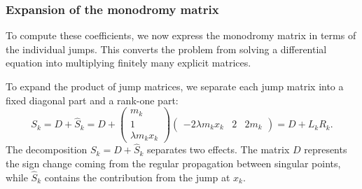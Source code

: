\documentclass[english,master]{liumaiex}
\theoremstyle{thesisplain}
\theoremstyle{thesisdefinition}
\numberwithin{equation}{section}
\begin{document}
\subsubsection*{Expansion of the monodromy matrix}

To compute these coefficients, we now express the monodromy matrix in terms of the individual jumps. This converts the problem from solving a differential equation into multiplying finitely many explicit matrices.

To expand the product of jump matrices, we separate each jump matrix into a fixed diagonal part and a rank-one part:
\begin{equation}
	S_k = D + \hat{S}_k = D + 
	\begin{pmatrix}
		m_k \\ 1 \\ \lambda m_k x_k		
	\end{pmatrix}
	\begin{pmatrix}
		-2 \lambda m_k x_k & 2 & 2 m_k
	\end{pmatrix}
	= D + L_k R_k.
\end{equation}
The decomposition $S_k=D+\hat{S}_k$ separates two effects. The matrix $D$ represents the sign change coming from the regular propagation between singular points, while $\hat{S}_k$ contains the contribution from the jump at $x_k$.
\end{document}
